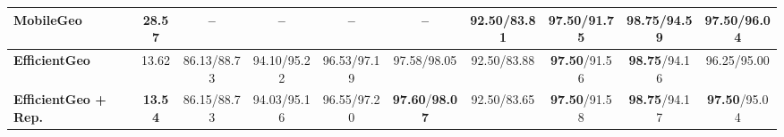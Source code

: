\begin{table}[t]
\begin{tabular*}{\textwidth}{@{\extracolsep{\fill}}lc*{8}{c}@{}}
MobileGeo~\cite{sun2025mobilegeo} & 28.57 & -- & -- & -- & -- & 92.50/83.81 & \textbf{97.50}/91.75 & \textbf{98.75}/94.59 & \textbf{97.50}/\textbf{96.04} \\
\midrule\textbf{EfficientGeo} & 13.62 & 86.13/88.73 & 94.10/95.22 & 96.53/97.19 & 97.58/98.05 & 92.50/83.88 & \textbf{97.50}/91.56 & \textbf{98.75}/94.16 & 96.25/95.00 \\
\textbf{EfficientGeo + Rep.} & \textbf{13.54} & 86.15/88.73 & 94.03/95.16 & 96.55/97.20 & \textbf{97.60}/\textbf{98.07} & 92.50/83.65 & \textbf{97.50}/91.58 & \textbf{98.75}/94.17 & \textbf{97.50}/95.04 \\
\bottomrule
\end{tabular*}
\par{}
\end{table}


